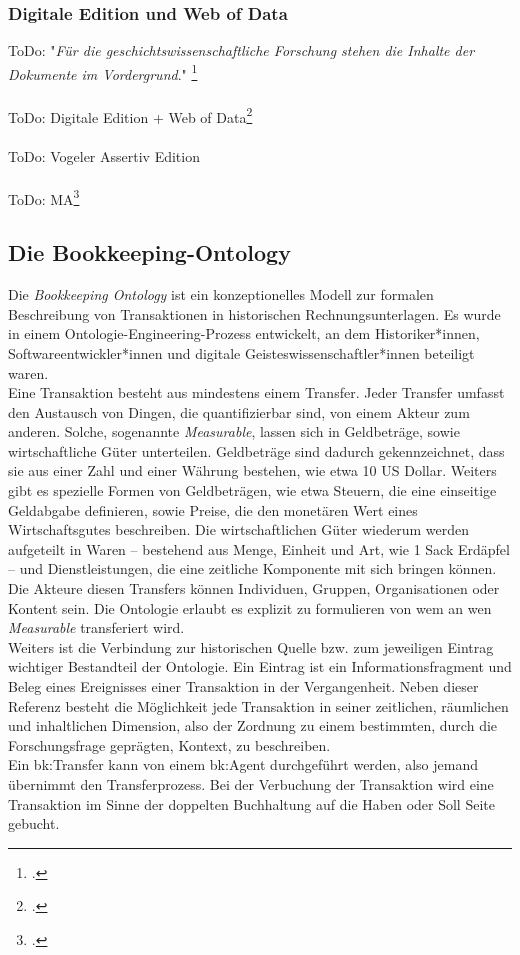 \documentclass[12pt,a4paper]{article}
\begin{document}
\subsubsection{Digitale Edition und Web of Data}

ToDo: "\textit{Für die geschichtswissenschaftliche Forschung stehen die Inhalte der Dokumente im Vordergrund}."
\footcite[][S.236]{sahle2017dhedition}
\\
\\
ToDo: Digitale Edition + Web of Data\footcite[][S.95-112]{ScholgerMartina2018AadS} 
\\
\\
ToDo: Vogeler Assertiv Edition
\\
\\
ToDo: MA\footcite[][]{meyer2019datenmodellierung}

\newpage
\subsection{Die Bookkeeping-Ontology}
\label{BK}

Die \textit{Bookkeeping Ontology} ist ein konzeptionelles Modell zur formalen Beschreibung von Transaktionen in historischen Rechnungsunterlagen. Es wurde in einem Ontologie-Engineering-Prozess entwickelt, an dem Historiker*innen, Softwareentwickler*innen und digitale Geisteswissenschaftler*innen beteiligt waren.  \\
Eine Transaktion besteht aus mindestens einem Transfer. Jeder Transfer umfasst den Austausch von Dingen, die quantifizierbar sind, von einem Akteur zum anderen. Solche, sogenannte \textit{Measurable}, lassen sich in Geldbeträge, sowie wirtschaftliche Güter unterteilen. Geldbeträge sind dadurch gekennzeichnet, dass sie aus einer Zahl und einer Währung bestehen, wie etwa 10 US Dollar. Weiters gibt es spezielle Formen von Geldbeträgen, wie etwa Steuern, die eine einseitige Geldabgabe definieren, sowie Preise, die den monetären Wert eines Wirtschaftsgutes beschreiben. Die wirtschaftlichen Güter wiederum werden aufgeteilt in Waren -- bestehend aus Menge, Einheit und Art, wie 1 Sack Erdäpfel -- und Dienstleistungen, die eine zeitliche Komponente mit sich bringen können. Die Akteure diesen Transfers können Individuen, Gruppen, Organisationen oder Kontent sein. Die Ontologie erlaubt es explizit zu formulieren von wem an wen \textit{Measurable} transferiert wird.
\\
Weiters ist die Verbindung zur historischen Quelle bzw. zum jeweiligen Eintrag wichtiger Bestandteil der Ontologie. Ein Eintrag ist ein Informationsfragment und Beleg eines Ereignisses einer Transaktion in der Vergangenheit. Neben dieser Referenz besteht die Möglichkeit jede Transaktion in seiner zeitlichen, räumlichen und inhaltlichen Dimension, also der Zordnung zu einem bestimmten, durch die Forschungsfrage geprägten, Kontext, zu beschreiben.
\\
Ein bk:Transfer kann von einem bk:Agent durchgeführt werden, also jemand übernimmt den Transferprozess. Bei der Verbuchung der Transaktion wird eine Transaktion im Sinne der doppelten Buchhaltung auf die Haben oder Soll Seite gebucht. 
\end{document}
